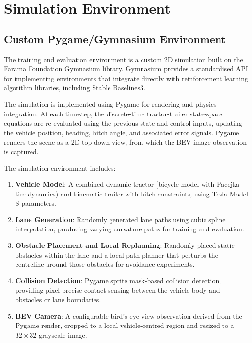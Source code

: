 \chapter{Simulation Environment}
\label{ch:simulation}

\section{Custom Pygame/Gymnasium Environment}

The training and evaluation environment is a custom 2D simulation built on the Farama Foundation Gymnasium library. Gymnasium provides a standardised API for implementing environments that integrate directly with reinforcement learning algorithm libraries, including Stable Baselines3.

The simulation is implemented using Pygame for rendering and physics integration. At each timestep, the discrete-time tractor-trailer state-space equations are re-evaluated using the previous state and control inputs, updating the vehicle position, heading, hitch angle, and associated error signals. Pygame renders the scene as a 2D top-down view, from which the BEV image observation is captured.

The simulation environment includes:

\begin{enumerate}
    \item \textbf{Vehicle Model}: A combined dynamic tractor (bicycle model with Pacejka tire dynamics) and kinematic trailer with hitch constraints, using Tesla Model S parameters.
    \item \textbf{Lane Generation}: Randomly generated lane paths using cubic spline interpolation, producing varying curvature paths for training and evaluation.
    \item \textbf{Obstacle Placement and Local Replanning}: Randomly placed static obstacles within the lane and a local path planner that perturbs the centreline around those obstacles for avoidance experiments.
    \item \textbf{Collision Detection}: Pygame sprite mask-based collision detection, providing pixel-precise contact sensing between the vehicle body and obstacles or lane boundaries.
    \item \textbf{BEV Camera}: A configurable bird's-eye view observation derived from the Pygame render, cropped to a local vehicle-centred region and resized to a $32 \times 32$ grayscale image.
\end{enumerate}

